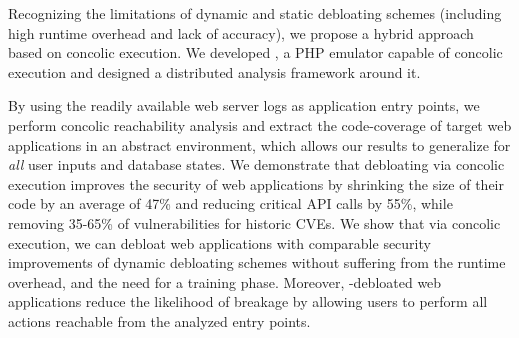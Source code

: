 Recognizing the limitations of dynamic and static debloating schemes (including high runtime overhead and lack of accuracy), we propose a hybrid approach based on concolic execution. 
We developed \animatedead{}, a PHP emulator capable of concolic execution and designed a distributed analysis framework around it. 

By using the readily available web server logs as application entry points, we perform concolic reachability analysis and extract the code-coverage of target web applications in an abstract environment, which allows our results to generalize for \emph{all} user inputs and database states. 
We demonstrate that debloating via concolic execution improves the security of web applications by shrinking the size of their code by an average of 47\% and reducing critical API calls by 55\%, while removing 35-65\% of vulnerabilities for historic CVEs. 
We show that via concolic execution, we can debloat web applications with comparable security improvements of dynamic debloating schemes without suffering from the runtime overhead, and the need for a training phase. 
Moreover, \animatedead{}-debloated web applications reduce the likelihood of breakage by allowing users to perform all actions reachable from the analyzed entry points.






% 
% 

